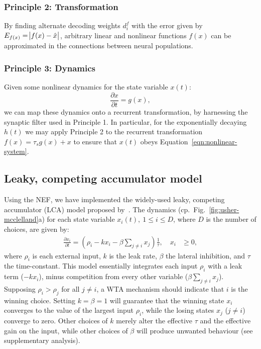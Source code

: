 \documentclass[10pt,letterpaper]{article}
\begin{document}
\subsubsection{Principle 2: Transformation}
By finding alternate decoding weights $d^f_i$ with the error given by $E_{f(x)} = \abs{f(x) - \hat x}$, arbitrary linear and nonlinear functions $f(x)$ can be approximated in the connections between neural populations.

\subsubsection{Principle 3: Dynamics}
Given some nonlinear dynamics for the state variable $x(t)$:
\begin{equation} \label{eqn:nonlinear-system}
    \frac{\partial x}{\partial t} = g(x) ,
\end{equation}
we can map these dynamics onto a recurrent transformation, by harnessing the synaptic filter used in Principle 1.
In particular, for the exponentially decaying $h(t)$ we may apply Principle 2 to the recurrent transformation $f(x) = \tau_s g(x) + x$ to ensure that $x(t)$ obeys Equation~\ref{eqn:nonlinear-system}.

\subsection{Leaky, competing accumulator model}
Using the NEF, we have implemented the widely-used leaky, competing accumulator (LCA) model proposed by~.
The dynamics (cp.~Fig.~\ref{fig:usher-mcclelland}a) for each state variable $x_i(t),\ 1 \leq i \leq D$, where $D$ is the number of choices, are given by:
\begin{equation} \label{eqn:usher-mcclelland}
    \begin{split}
        \frac{{\partial x}_i}{\partial t} = \left(\rho_i - kx_i - \beta \sum_{j \neq i} x_j\right) \frac{1}{\tau}, \quad x_i &\ge 0,
    \end{split}
\end{equation}
where $\rho_i$ is each external input, $k$ is the leak rate, $\beta$ the lateral inhibition, and $\tau$ the time-constant.
This model essentially integrates each input $\rho_i$ with a leak term ($- kx_i$), minus competition from every other variable ($\beta \sum_{j \neq i} x_j$).
Supposing $\rho_i > \rho_j$ for all $j \ne i$, a WTA mechanism should indicate that $i$ is the winning choice.
Setting $k = \beta = 1$ will guarantee that the winning state $x_i$ converges to the value of the largest input $\rho_i$, while the losing states $x_j$ ($j \ne i$) converge to zero.
Other choices of $k$ merely alter the effective $\tau$ and the effective gain on the input, while other choices of $\beta$ will produce unwanted behaviour (see supplementary analysis).
\end{document}
